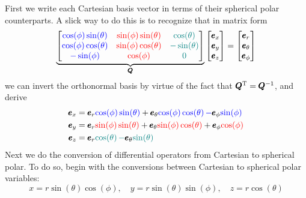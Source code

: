\documentclass[a4paper]{article}
\begin{document}
\begin{enumerate}[label=(\alph*)]
	First we write each Cartesian basis vector in terms of their spherical polar counterparts. A slick way to do this is to recognize that in matrix form
	\[
		\underbrace{\begin{bmatrix}
			\textcolor{blue}{\cos\!\left(\phi\right)\sin\!\left(\theta\right)} & \textcolor{red}{\sin\!\left(\phi\right)\sin\!\left(\theta\right)} & \textcolor{teal}{\cos\!\left(\theta\right)} \\
			\textcolor{blue}{\cos\!\left(\phi\right)\cos\!\left(\theta\right)} & \textcolor{red}{\sin\!\left(\phi\right)\cos\!\left(\theta\right)} & \textcolor{teal}{-\sin\!\left(\theta\right)} \\
			\textcolor{blue}{-\sin\!\left(\phi\right)} & \textcolor{red}{\cos\!\left(\phi\right)} & \textcolor{teal}{0}
		\end{bmatrix}}_{\pmb{Q}}
		\begin{bmatrix}
			\pmb{e}_{x} \\
			\pmb{e}_{y} \\
			\pmb{e}_{z}
		\end{bmatrix}
		=
		\begin{bmatrix}
			\pmb{e}_{r} \\
			\pmb{e}_{\theta} \\
			\pmb{e}_{\phi}
		\end{bmatrix}
	\]
	we can invert the orthonormal basis by virtue of the fact that \( \pmb{Q}^{\textsc{T}} = \pmb{Q}^{-1} \), and derive
	\begin{align*}
		\pmb{e}_{x} & = \pmb{e}_{r}\textcolor{blue}{\cos\!\left(\phi\right)\sin\!\left(\theta\right)} + \pmb{e}_{\theta}\textcolor{blue}{\cos\!\left(\phi\right)\cos\!\left(\theta\right) -} \pmb{e}_{\phi}\textcolor{blue}{\sin\!\left(\phi\right)} \\
		\pmb{e}_{y} & = \pmb{e}_{r}\textcolor{red}{\sin\!\left(\phi\right)\sin\!\left(\theta\right)} + \pmb{e}_{\theta}\textcolor{red}{\sin\!\left(\phi\right)\cos\!\left(\theta\right)} + \pmb{e}_{\phi}\textcolor{red}{\cos\!\left(\phi\right)} \\ 
		\pmb{e}_{z} & = \pmb{e}_{r}\textcolor{teal}{\cos\!\left(\theta\right) -} \pmb{e}_{\theta}\textcolor{teal}{\sin\!\left(\theta\right)}
	\end{align*}
	Next we do the conversion of differential operators from Cartesian to spherical polar. To do so, begin with the conversions between Cartesian to spherical polar variables:
	\[
		x = r \sin\!\left(\theta\right)\cos\!\left(\phi\right), \quad y = r \sin\!\left(\theta\right)\sin\!\left(\phi\right), \quad z = r \cos\!\left(\theta\right) 
\]
\end{enumerate}
\end{document}
